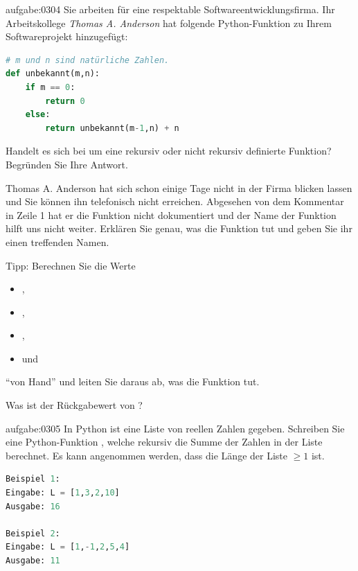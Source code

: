\begin{aufgabe}{aufgabe:0304}
Sie arbeiten für eine respektable Softwareentwicklungsfirma. Ihr Arbeitskollege \textit{Thomas A. Anderson} hat folgende Python-Funktion zu Ihrem Softwareprojekt hinzugefügt:
\begin{lstlisting}[language=Python]
# m und n sind natürliche Zahlen.
def unbekannt(m,n):
    if m == 0:
        return 0
    else:
        return unbekannt(m-1,n) + n
\end{lstlisting}
\begin{aenum}
    \item Handelt es sich bei  um eine rekursiv oder nicht rekursiv definierte Funktion? Begründen Sie Ihre Antwort.
    \item Thomas A. Anderson hat sich schon einige Tage nicht in der Firma blicken lassen und Sie können ihn telefonisch nicht erreichen. Abgesehen von dem Kommentar in Zeile 1 hat er die Funktion  nicht dokumentiert und der Name der Funktion hilft uns nicht weiter. Erklären Sie genau, was die Funktion tut und geben Sie ihr einen treffenden Namen.
    
    \noindent
    Tipp: Berechnen Sie die Werte
    \begin{itemize}
        \item {},
        \item {},
        \item {},
        \item und 
    \end{itemize}
    \enquote{von Hand} und leiten Sie daraus ab, was die Funktion tut.
    \item Was ist der Rückgabewert von ?
\end{aenum}
\end{aufgabe}

\clearpage
\begin{aufgabe}{aufgabe:0305}
In Python ist eine Liste  von reellen Zahlen gegeben. Schreiben Sie eine Python-Funktion , welche rekursiv die Summe der Zahlen in der Liste berechnet. Es kann angenommen werden, dass die Länge der Liste $\geq 1$ ist.
\begin{lstlisting}[language=Python]
Beispiel 1:
Eingabe: L = [1,3,2,10]
Ausgabe: 16

Beispiel 2:
Eingabe: L = [1,-1,2,5,4]
Ausgabe: 11

\end{lstlisting}
\end{aufgabe}



